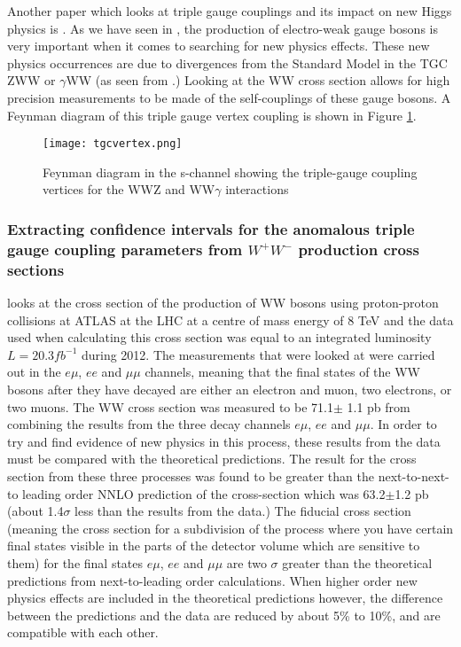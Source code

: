 \documentclass[11pt,oneside,a4paper]{article}
\begin{document}
Another paper which looks at triple gauge couplings and its impact on new Higgs physics is \cite{WWtgc}. As we have seen in \cite{higgsdata}, the production of electro-weak gauge bosons is very important when it comes to searching for new physics effects. These new physics occurrences are due to divergences from the Standard Model in the TGC ZWW or $\gamma$WW (as seen from \cite{higgsdata}.) Looking at the WW cross section allows for high precision measurements to be made of the self-couplings of these gauge bosons. A Feynman diagram of this triple gauge vertex coupling is shown in Figure \ref{fig:tgcvertex}.

\begin{figure}
\centering
\texttt{[image: tgcvertex.png]}
\caption{Feynman diagram in the s-channel showing the triple-gauge coupling vertices for the WWZ and WW$\gamma$ interactions}
\label{fig:tgcvertex}
\end{figure}

\subsubsection{Extracting confidence intervals for the anomalous triple gauge coupling parameters from $W^{+}W^{-}$ production cross sections}

\cite{WWtgc} looks at the cross section of the production of WW bosons using proton-proton collisions at ATLAS at the LHC at a centre of mass energy of 8 TeV and the data used when calculating this cross section was equal to an integrated luminosity $L = 20.3 fb^{-1}$ during 2012. The measurements that were looked at were carried out in the $e\mu$, $ee$ and $\mu\mu$ channels, meaning that the final states of the WW bosons after they have decayed are either an electron and muon, two electrons, or two muons. The WW cross section was measured to be  71.1$\pm$ 1.1 pb from combining the results from the three decay channels $e\mu$, $ee$ and $\mu\mu$. In order to try and find evidence of new physics in this process, these results from the data must be compared with the theoretical predictions. The result for the cross section from these three processes was found to be greater than the next-to-next-to leading order NNLO prediction of the cross-section which was 63.2$\pm$1.2 pb (about 1.4$\sigma$ less than the results from the data.) The fiducial cross section (meaning the cross section for a subdivision of the process where you have certain final states visible in the parts of the detector volume which are sensitive to them) for the final states  $e\mu$, $ee$ and $\mu\mu$ are two $\sigma$ greater than the theoretical predictions from next-to-leading order calculations. When higher order new physics effects are included in the theoretical predictions however, the difference between the predictions and the data are reduced by about 5\% to 10\%, and are compatible with each other. 
\end{document}
